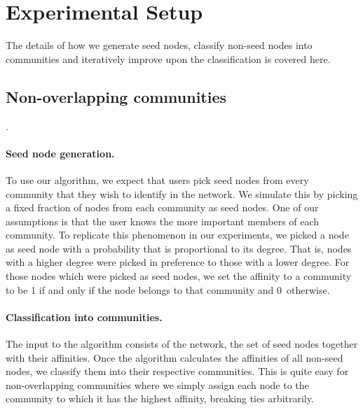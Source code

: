 %

\section{Experimental Setup}

The details of how we generate seed nodes, classify non-seed nodes into communities and iteratively 
improve upon the classification is covered here.

\subsection{Non-overlapping communities}
.


\paragraph{Seed node generation.} 
To use our algorithm, we expect that users pick seed nodes from 
every community that they wish to identify in the network. 
We simulate this by picking a fixed fraction of nodes from each community as seed nodes.
One of our assumptions is that the user knows the more important members of each community. 
To replicate this phenomenon in our experiments, we picked a node as seed node
with a probability that is proportional to its degree.
That is, nodes with a higher degree were picked in preference to those with a lower degree.
For those nodes which were picked as seed nodes, we set the affinity to a community to be 1 if 
and only if the node belongs to that community and 0~otherwise.

\paragraph{Classification into communities.}
The input to the algorithm consists of the network, the set of seed nodes together with their 
affinities. Once the algorithm calculates the affinities of all non-seed nodes, we classify 
them into their respective communities. This is quite easy for non-overlapping 
communities where we simply assign each node to the community to which it has the 
highest affinity, breaking ties arbitrarily.

